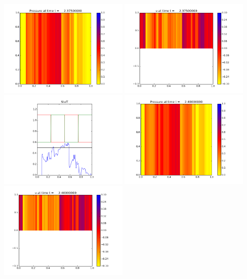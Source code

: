 \documentclass[11pt]{article}
\begin{document}
\vskip 10pt 
\includegraphics[width=0.475\textwidth]{frame0095fig0.png}
\includegraphics[width=0.475\textwidth]{frame0095fig1.png}
\vskip 10pt 
\includegraphics[width=0.475\textwidth]{frame0095fig3.png}
\vskip 10pt 
\includegraphics[width=0.475\textwidth]{frame0096fig0.png}
\includegraphics[width=0.475\textwidth]{frame0096fig1.png}
\end{document}
